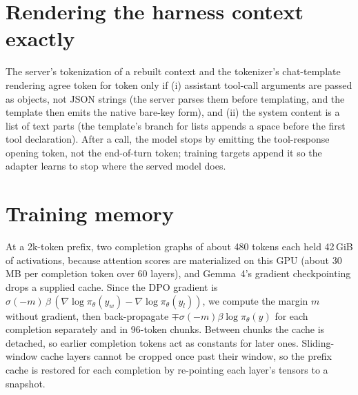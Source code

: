\documentclass[11pt]{article}
\begin{document}



\appendix

\section{Rendering the harness context exactly}\label{app:rendering}

The server's tokenization of a rebuilt context and the tokenizer's chat-template rendering agree token for token only if (i) assistant tool-call arguments are passed as objects, not JSON strings (the server parses them before templating, and the template then emits the native bare-key form), and (ii) the system content is a list of text parts (the template's branch for lists appends a space before the first tool declaration). After a call, the model stops by emitting the tool-response opening token, not the end-of-turn token; training targets append it so the adapter learns to stop where the served model does.

\section{Training memory}\label{app:training}

At a 2k-token prefix, two completion graphs of about 480 tokens each held 42\,GiB of activations, because attention scores are materialized on this GPU (about 30\,MB per completion token over 60 layers), and Gemma~4's gradient checkpointing drops a supplied cache. Since the DPO gradient is $\sigma(-m)\,\beta\,(\nabla \log\pi_\theta(y_w) - \nabla\log\pi_\theta(y_l))$, we compute the margin $m$ without gradient, then back-propagate $\mp\sigma(-m)\beta\log\pi_\theta(y)$ for each completion separately and in 96-token chunks. Between chunks the cache is detached, so earlier completion tokens act as constants for later ones. Sliding-window cache layers cannot be cropped once past their window, so the prefix cache is restored for each completion by re-pointing each layer's tensors to a snapshot.
\end{document}
